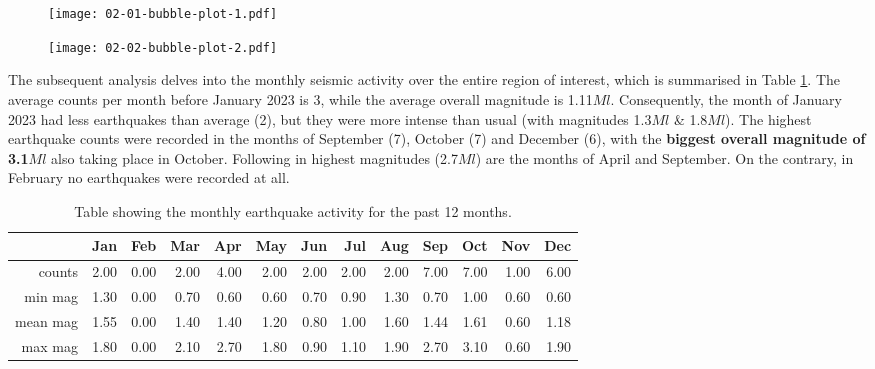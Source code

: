 \documentclass[a4paper]{article}
\begin{document}
\begin{figure}[H]
  \centering
  \begin{minipage}[b]{0.49\textwidth}
    \texttt{[image: 02-01-bubble-plot-1.pdf]}
    \caption{}
    \label{fig4}
  \end{minipage}
  \hspace{0.1em}
  \begin{minipage}[b]{0.49\textwidth}
    \texttt{[image: 02-02-bubble-plot-2.pdf]}
    \caption{}
    \label{fig5}
  \end{minipage}
\end{figure}

\noindent The subsequent analysis delves into the monthly seismic activity over the entire region of interest, which is summarised in Table \ref{tab1}. The average counts per month before January 2023 is 3, while the average overall magnitude is 1.11$Ml$. Consequently, the month of January 2023 had less earthquakes than average (2), but they were more intense than usual (with magnitudes 1.3$Ml$ \& 1.8$Ml$). The highest earthquake counts were recorded in the months of September (7), October (7) and December (6), with the \textbf{biggest overall magnitude of 3.1$Ml$} also taking place in October. Following in highest magnitudes (2.7$Ml$) are the months of April and September. On the contrary, in February no earthquakes were recorded at all.\\

\begin{table}[ht]
\centering
\begin{tabular}{rrrrrrrrrrrrr}
  \hline
 & Jan & Feb & Mar & Apr & May & Jun & Jul & Aug & Sep & Oct & Nov & Dec \\ 
  \hline
counts & 2.00 & 0.00 & 2.00 & 4.00 & 2.00 & 2.00 & 2.00 & 2.00 & 7.00 & 7.00 & 1.00 & 6.00 \\ 
  min mag & 1.30 & 0.00 & 0.70 & 0.60 & 0.60 & 0.70 & 0.90 & 1.30 & 0.70 & 1.00 & 0.60 & 0.60 \\ 
  mean mag & 1.55 & 0.00 & 1.40 & 1.40 & 1.20 & 0.80 & 1.00 & 1.60 & 1.44 & 1.61 & 0.60 & 1.18 \\ 
  max mag & 1.80 & 0.00 & 2.10 & 2.70 & 1.80 & 0.90 & 1.10 & 1.90 & 2.70 & 3.10 & 0.60 & 1.90 \\ 
   \hline
\end{tabular}
\caption{Table showing the monthly earthquake activity for the past
                       12 months.} 
\label{tab1}
\end{table}
\end{document}
